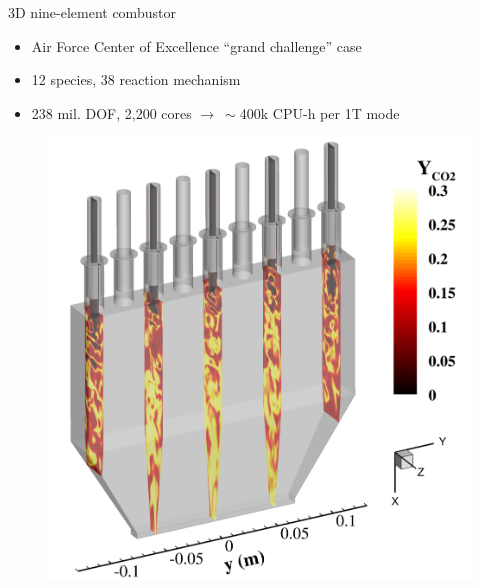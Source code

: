 \documentclass[]{beamer}
\begin{document}
\begin{frame}{3D nine-element combustor\footnotemark[11]}
	\begin{itemize}
		\item Air Force Center of Excellence ``grand challenge'' case
		\item 12 species, 38 reaction mechanism 
		\item 238 mil. DOF, 2,200 cores $\rightarrow ~\sim$400k CPU-h per 1T mode
	\end{itemize}
	\begin{figure}
		\begin{minipage}{0.45\linewidth}
			\includegraphics[width=0.99\linewidth]{Images/experiments/9elem/geom_iso.png}
		\end{minipage}
		\begin{minipage}{0.45\linewidth}
		\end{minipage}
	\end{figure}
\end{frame}
\end{document}

